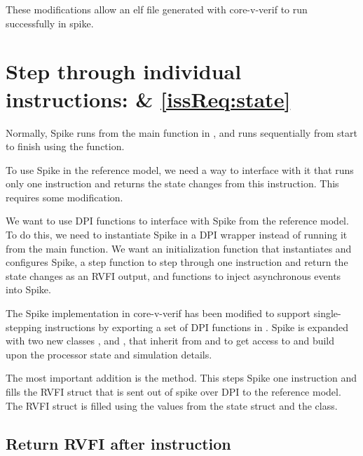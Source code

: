 These modifications allow an elf file generated with core-v-verif to run successfully in spike.


%

\section{Step through individual instructions:  \& \ref{issReq:state}}


Normally, Spike runs from the main function in , and runs sequentially from start to finish using the  function.

To use Spike in the reference model, we need a way to interface with it that runs only one instruction and returns the state changes from this instruction. This requires some modification. 

We want to use DPI functions to interface with Spike from the reference model. To do this, we need to instantiate Spike in a DPI wrapper instead of running it from the main function. We want an initialization function that instantiates and configures Spike, a step function to step through one instruction and return the state changes as an RVFI output, and functions to inject asynchronous events into Spike.

The Spike implementation in core-v-verif has been modified to support single-stepping instructions by exporting a set of DPI functions in . Spike is expanded with two new classes , and , that inherit from  and  to get access to and build upon the processor state and simulation details.

The most important addition is the  method. This steps Spike one instruction and fills the  RVFI struct that is sent out of spike over DPI to the reference model. The RVFI struct is filled using the values from the  state struct and the  class.



\subsection{Return RVFI after instruction}

